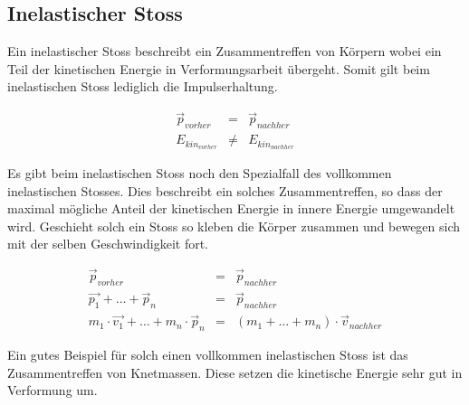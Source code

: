 \subsection{Inelastischer Stoss}
Ein inelastischer Stoss beschreibt ein Zusammentreffen von Körpern wobei ein
Teil der kinetischen Energie in Verformungsarbeit übergeht. Somit gilt beim
inelastischen Stoss lediglich die Impulserhaltung. 

\[ \boxed{
	\begin{array}{rcl}
		\vec{p}_{vorher} &= &\vec{p}_{nachher} \\
		E_{kin_{vorher}} &\neq &E_{kin_{nachher}}
	\end{array}
} \]

\noindent
Es gibt beim inelastischen Stoss noch den Spezialfall des vollkommen 
inelastischen Stosses. Dies beschreibt ein solches Zusammentreffen, so dass
der maximal mögliche Anteil der kinetischen Energie in innere Energie
umgewandelt wird. Geschieht solch ein Stoss so kleben die Körper zusammen
und bewegen sich mit der selben Geschwindigkeit fort.

\[ \boxed{
	\begin{array}{rcl}
		\vec{p}_{vorher} &= & \vec{p}_{nachher} \\
		\vec{p_1} + \dots + \vec{p}_n &= &\vec{p}_{nachher} \\
		m_1 \cdot \vec{v_1} + \dots + m_n \cdot \vec{p}_n&= 
			& (m_1 + \dots + m_n)\cdot \vec{v}_{nachher}
	\end{array}
} \]

\noindent
Ein gutes Beispiel für solch einen vollkommen inelastischen Stoss ist
das Zusammentreffen von Knetmassen. Diese setzen die kinetische Energie
sehr gut in Verformung um.
